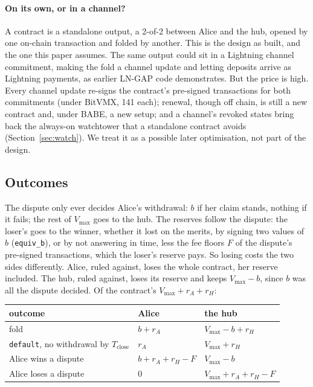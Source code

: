 \documentclass[11pt]{article}
\newcommand{\vmax}{V_{\max}}
\newcommand{\Tc}{T_{\mathrm{close}}}
\newcommand{\tx}[1]{\texttt{#1}}
\begin{document}
\paragraph{On its own, or in a channel?} A contract is a standalone
output, a 2-of-2 between Alice and the hub, opened by one on-chain
transaction and folded by another. This is the design as built, and the
one this paper assumes. The same output could sit in a Lightning channel
commitment, making the fold a channel update and letting deposits arrive
as Lightning payments, as earlier LN-GAP code demonstrates. But the
price is high. Every channel update re-signs the contract's pre-signed
transactions for both commitments (under BitVMX, 141 each); renewal,
though off chain, is still a new contract and, under BABE, a new setup;
and a channel's revoked states bring back the always-on watchtower that a
standalone contract avoids (Section~\ref{sec:watch}). We treat it as a
possible later optimisation, not part of the design.

\subsection{Outcomes}
\label{sec:outcomes}

The dispute only ever decides Alice's withdrawal: $b$ if her claim
stands, nothing if it fails; the rest of $\vmax$ goes to the hub. The
reserves follow the dispute: the loser's goes to the winner, whether
it lost on the merits, by signing two values of $b$ (\tx{equiv\_b}), or
by not answering in time, less the fee floors $F$ of the dispute's
pre-signed transactions, which the loser's reserve pays. So losing costs
the two sides differently. Alice, ruled against, loses the whole
contract, her reserve included. The hub, ruled against, loses its
reserve and keeps $\vmax - b$, since $b$ was all the dispute decided. Of
the contract's $\vmax + r_A + r_H$:
\begin{center}
\small
\begin{tabular}{lll}
\toprule
outcome & Alice & the hub \\
\midrule
fold & $b + r_A$ & $\vmax - b + r_H$ \\
\tx{default}, no withdrawal by $\Tc$ & $r_A$ & $\vmax + r_H$ \\
Alice wins a dispute & $b + r_A + r_H - F$ & $\vmax - b$ \\
Alice loses a dispute & $0$ & $\vmax + r_A + r_H - F$ \\
\bottomrule
\end{tabular}
\end{center}
\end{document}

